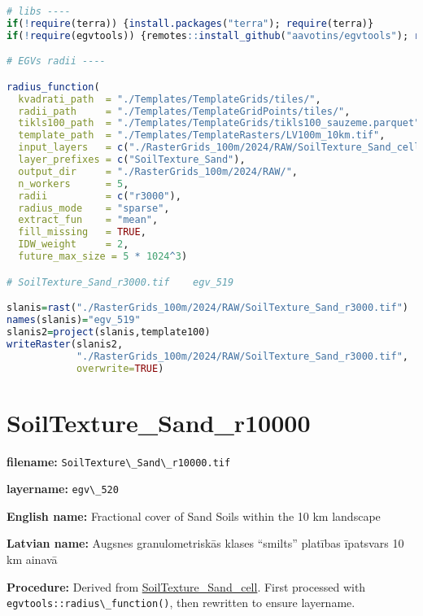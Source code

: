 \documentclass[
]{book}
\newcommand{\passthrough}[1]{#1}
\begin{document}
\begin{lstlisting}[language=R]
# libs ----
if(!require(terra)) {install.packages("terra"); require(terra)}
if(!require(egvtools)) {remotes::install_github("aavotins/egvtools"); require(egvtools)}

# EGVs radii ----

radius_function(
  kvadrati_path  = "./Templates/TemplateGrids/tiles/",
  radii_path     = "./Templates/TemplateGridPoints/tiles/",
  tikls100_path  = "./Templates/TemplateGrids/tikls100_sauzeme.parquet",
  template_path  = "./Templates/TemplateRasters/LV100m_10km.tif",
  input_layers   = c("./RasterGrids_100m/2024/RAW/SoilTexture_Sand_cell.tif"),
  layer_prefixes = c("SoilTexture_Sand"),
  output_dir     = "./RasterGrids_100m/2024/RAW/",
  n_workers      = 5,
  radii          = c("r3000"),
  radius_mode    = "sparse",
  extract_fun    = "mean",
  fill_missing   = TRUE,
  IDW_weight     = 2,
  future_max_size = 5 * 1024^3)

# SoilTexture_Sand_r3000.tif    egv_519

slanis=rast("./RasterGrids_100m/2024/RAW/SoilTexture_Sand_r3000.tif")
names(slanis)="egv_519"
slanis2=project(slanis,template100)
writeRaster(slanis2,
            "./RasterGrids_100m/2024/RAW/SoilTexture_Sand_r3000.tif",
            overwrite=TRUE)
\end{lstlisting}

\section{SoilTexture\_Sand\_r10000}\label{ch06.520}

\textbf{filename:} \passthrough{\lstinline!SoilTexture\_Sand\_r10000.tif!}

\textbf{layername:} \passthrough{\lstinline!egv\_520!}

\textbf{English name:} Fractional cover of Sand Soils within the 10 km landscape

\textbf{Latvian name:} Augsnes granulometriskās klases ``smilts'' platības īpatsvars 10 km ainavā

\textbf{Procedure:} Derived from \hyperref[ch06.516]{SoilTexture\_Sand\_cell}. First processed
with \passthrough{\lstinline!egvtools::radius\_function()!}, then rewritten to ensure layername.
\end{document}
